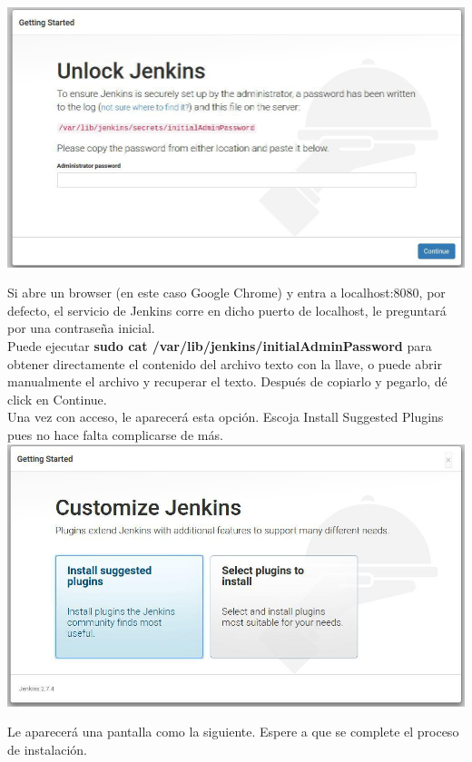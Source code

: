 \documentclass[a4paper]{article}
\begin{document}
{\centering
	\includegraphics[scale=0.5]{unlockjenkins}
\justify

Si abre un browser (en este caso Google Chrome) y entra a localhost:8080, por defecto, el servicio de Jenkins corre en dicho puerto de localhost, le preguntará por una contraseña inicial. \\

	Puede ejecutar \textbf {sudo cat /var/lib/jenkins/initialAdminPassword} para obtener directamente el contenido del archivo texto con la llave, o puede abrir manualmente el archivo y recuperar el texto. Después de copiarlo y pegarlo, dé click en Continue. \\

	Una vez con acceso, le aparecerá esta opción. Escoja Install Suggested Plugins pues no hace falta complicarse de más. \\

\centering
	\includegraphics[scale=0.5]{suggjenkins}
\justify

\newpage Le aparecerá una pantalla como la siguiente. Espere a que se complete el proceso de instalación.  \\
   
}
\end{document}
